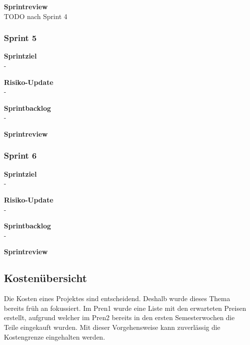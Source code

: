 \textbf{Sprintreview}\\
TODO nach Sprint 4

\newpage

\subsubsection{Sprint 5}
\textbf{Sprintziel}\\
-

\textbf{Risiko-Update}\\
-

\textbf{Sprintbacklog}\\
-

\textbf{Sprintreview}\\

\subsubsection{Sprint 6}
\textbf{Sprintziel}\\
-

\textbf{Risiko-Update}\\
-

\textbf{Sprintbacklog}\\
-

\textbf{Sprintreview}\\




\subsection{Kostenübersicht}

Die Kosten eines Projektes sind entscheidend. Deshalb wurde dieses Thema bereits früh an fokussiert. Im Pren1 wurde eine Liste mit den erwarteten Preisen erstellt, aufgrund welcher im Pren2 bereits in den ersten Semesterwochen die Teile eingekauft wurden. Mit dieser Vorgehensweise kann zuverlässig die Kostengrenze eingehalten werden.

